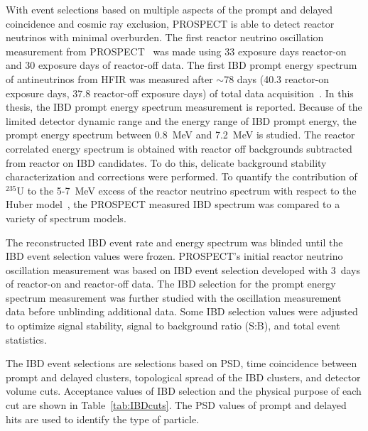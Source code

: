 \label{Ch9}

With event selections based on multiple aspects of the prompt and delayed coincidence and cosmic ray exclusion, PROSPECT is able to detect reactor neutrinos with minimal overburden.
The first reactor neutrino oscillation measurement from PROSPECT~\cite{bib:prospect_osc} was made using 33 exposure days reactor-on and 30 exposure days of reactor-off data. 
The first IBD prompt energy spectrum of antineutrinos from HFIR was measured after $\sim$78 days (40.3 reactor-on exposure days, 37.8 reactor-off exposure days) of total data acquisition~\cite{bib:prospect_spec}.
In this thesis, the IBD prompt energy spectrum measurement is reported.
Because of the limited detector dynamic range and the energy range of IBD prompt energy, the prompt energy spectrum between 0.8~MeV and 7.2~MeV is studied. 
The reactor correlated energy spectrum is obtained with reactor off backgrounds subtracted from reactor on IBD candidates.
To do this, delicate background stability characterization and corrections were performed.
To quantify the contribution of $^{235}$U to the 5-7~MeV excess of the reactor neutrino spectrum with respect to the Huber model~\cite{bib:huber}, the PROSPECT measured IBD spectrum was compared to a variety of spectrum models. 


The reconstructed IBD event rate and energy spectrum was blinded until the IBD event selection values were frozen.
PROSPECT's initial reactor neutrino oscillation measurement was based on IBD event selection developed with 3~days of reactor-on and reactor-off data.
The IBD selection for the prompt energy spectrum measurement was further studied with the oscillation measurement data before unblinding additional data. 
Some IBD selection values were adjusted to optimize signal stability, signal to background ratio (S:B), and total event statistics.

The IBD event selections are selections based on PSD, time coincidence between prompt and delayed clusters, topological spread of the IBD clusters, and detector volume cuts.
Acceptance values of IBD selection and the physical purpose of each cut are shown in Table~\ref{tab:IBDcuts}.
The PSD values of prompt and delayed hits are used to identify the type of particle.



